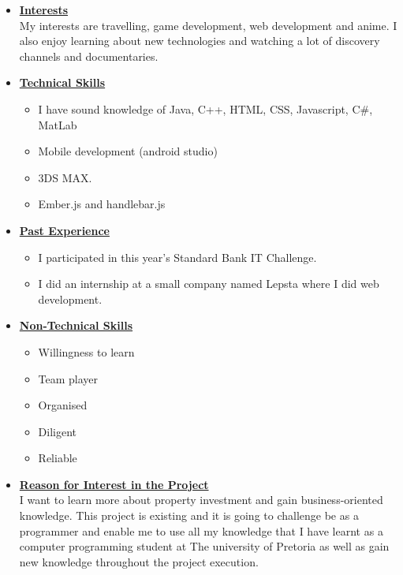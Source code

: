 \documentclass[a4paper,12pt]{article}
\begin{document}
\begin{itemize}
\item {\large \underline{\textbf{Interests}}}\\[0.2cm]
My interests are travelling, game development, web development and anime. I also enjoy learning about new technologies and watching a lot of discovery channels and documentaries.

\item {\large \underline{\textbf{Technical Skills}}}
	\begin{itemize}
		\item I have sound knowledge of Java, C++, HTML, CSS, Javascript, C\#, MatLab
		\item Mobile development (android studio) 
		\item 3DS MAX.
		\item Ember.js and  handlebar.js
	\end{itemize}
\bigskip
\item {\large \underline{\textbf{Past Experience}}}
\begin{itemize}
\item I participated in this year's Standard Bank IT Challenge.
\item I did an internship at a small company named Lepsta where I did web development.
\end{itemize}
\bigskip
\item {\large \underline{\textbf{Non-Technical Skills}}}
\begin{itemize}
\item Willingness to learn
\item Team player
\item Organised
\item Diligent
\item Reliable
\end{itemize}
\bigskip
\item {\large \underline{\textbf{Reason for Interest in the Project}}}\\[0.2cm]
I want to learn more about property investment and gain business-oriented knowledge. This project is existing and it is going to challenge be as a programmer and enable me to use all my knowledge that I have learnt as a computer programming student at The university of Pretoria as well as gain new knowledge throughout the project execution.

\end{itemize}

\newpage
\end{document}
